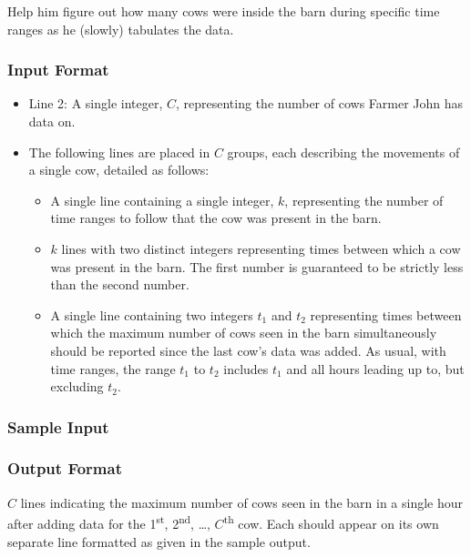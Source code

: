Help him figure out how many cows were inside the barn during specific time ranges as he (slowly) tabulates the data.

\subsubsection{Input Format}

\begin{itemize}
    \item Line 2: A single integer, $C$, representing the number of cows Farmer John has data on.

    \item The following lines are placed in $C$ groups, each describing the movements of a single cow, detailed as follows:
    \begin{itemize}
        \item A single line containing a single integer, $k$, representing the number of time ranges to follow that the cow was present in the barn.

        \item $k$ lines with two distinct integers representing times between which a cow was present in the barn.
        The first number is guaranteed to be strictly less than the second number.
        \item A single line containing two integers $t_1$ and $t_2$ representing times between which the maximum number of cows seen in the barn simultaneously should be reported since the last cow's data was added.
        As usual, with time ranges, the range $t_1$ to $t_2$ includes $t_1$ and all hours leading up to, but excluding $t_2$.
    \end{itemize}
\end{itemize}

\subsubsection{Sample Input}


\subsubsection{Output Format}

$C$ lines indicating the maximum number of cows seen in the barn in a single hour after adding data for the 1\textsuperscript{st}, 2\textsuperscript{nd}, \ldots, $C$\textsuperscript{th} cow.
Each should appear on its own separate line formatted as given in the sample output.

